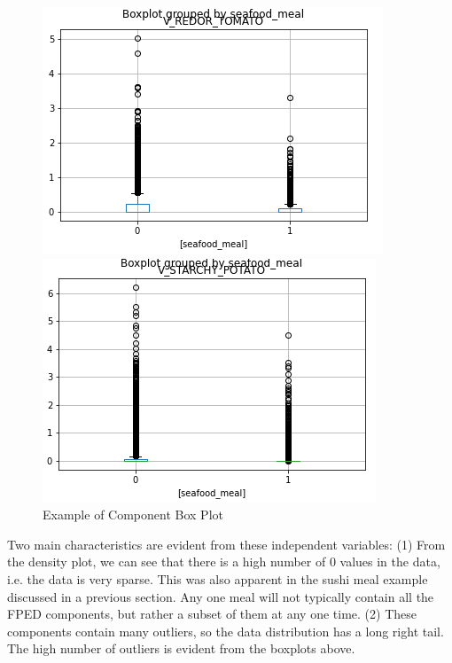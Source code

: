 \documentclass{article}
\begin{document}
\begin{figure}[htb]
\begin{minipage}[b]{.48\linewidth}
  \centering
  \centerline{\includegraphics[scale=0.3]{V_REDOR_TOMATO_box_plot.png}}
\end{minipage}
\hfill
\begin{minipage}[b]{0.48\linewidth}
  \centering
  \centerline{\includegraphics[scale=0.3]{V_STARCHY_POTATO_box_plot.png}}
\end{minipage}
\caption{Example of Component Box Plot}
\label{fig:res}
\end{figure}

Two main characteristics are evident from these independent variables: (1) From the density plot, we can see that there is a high number of 0 values in the data, i.e. the data is very sparse. This was also apparent in the sushi meal example discussed in a previous section. Any one meal will not typically contain all the FPED components, but rather a subset of them at any one time. (2) These components contain many outliers, so the data distribution has a long right tail. The high number of outliers is evident from the boxplots above.
\end{document}
